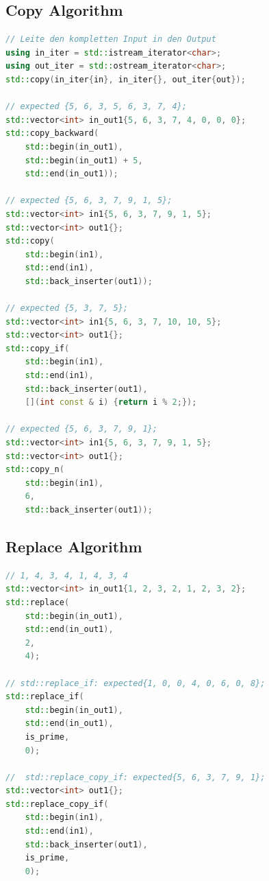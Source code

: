 \subsection{Copy Algorithm}
\begin{lstlisting}[language=C++, caption=Copy Algorithm]
// Leite den kompletten Input in den Output
using in_iter = std::istream_iterator<char>;
using out_iter = std::ostream_iterator<char>;
std::copy(in_iter{in}, in_iter{}, out_iter{out});

// expected {5, 6, 3, 5, 6, 3, 7, 4};
std::vector<int> in_out1{5, 6, 3, 7, 4, 0, 0, 0};
std::copy_backward(
	std::begin(in_out1),
	std::begin(in_out1) + 5,
	std::end(in_out1));

// expected {5, 6, 3, 7, 9, 1, 5};
std::vector<int> in1{5, 6, 3, 7, 9, 1, 5};
std::vector<int> out1{};
std::copy(
	std::begin(in1),
	std::end(in1),
	std::back_inserter(out1));
	
// expected {5, 3, 7, 5};
std::vector<int> in1{5, 6, 3, 7, 10, 10, 5};
std::vector<int> out1{};
std::copy_if(
	std::begin(in1),
	std::end(in1),
	std::back_inserter(out1),
	[](int const & i) {return i % 2;});

// expected {5, 6, 3, 7, 9, 1};
std::vector<int> in1{5, 6, 3, 7, 9, 1, 5};
std::vector<int> out1{}; 
std::copy_n(
	std::begin(in1),
	6,
	std::back_inserter(out1));
\end{lstlisting}


\subsection{Replace Algorithm}
\begin{lstlisting}[language=C++, caption=Replace Algorithm]
// 1, 4, 3, 4, 1, 4, 3, 4
std::vector<int> in_out1{1, 2, 3, 2, 1, 2, 3, 2};
std::replace(
	std::begin(in_out1),
	std::end(in_out1),
	2,
	4);
	
// std::replace_if: expected{1, 0, 0, 4, 0, 6, 0, 8};
std::replace_if(
	std::begin(in_out1),
	std::end(in_out1),
	is_prime,
	0);

//	std::replace_copy_if: expected{5, 6, 3, 7, 9, 1};
std::vector<int> out1{};
std::replace_copy_if(
	std::begin(in1),
	std::end(in1),
	std::back_inserter(out1),
	is_prime,
	0);
\end{lstlisting}


